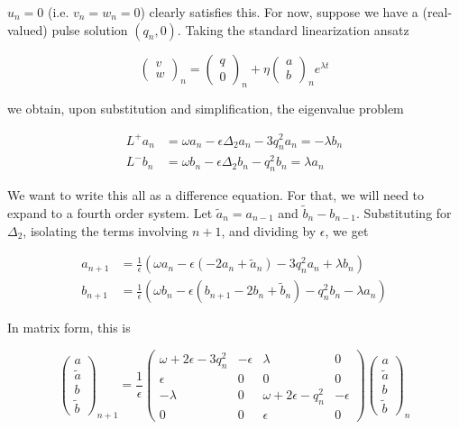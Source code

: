 \documentclass[12pt]{article}
\begin{document}
$u_n = 0$ (i.e. $v_n = w_n = 0$) clearly satisfies this. For now, suppose we have a (real-valued) pulse solution $(q_n, 0)$. Taking the standard linearization ansatz

\[
\begin{pmatrix}v \\ w\end{pmatrix}_n = 
\begin{pmatrix}q \\ 0\end{pmatrix}_n + 
\eta \begin{pmatrix}a \\ b\end{pmatrix}_n e^{\lambda t}
\]

we obtain, upon substitution and simplification, the eigenvalue problem

\begin{align*}
L^+ a_n &= \omega a_n - \epsilon \Delta_2 a_n - 3 q_n^2 a_n = -\lambda b_n \\
L^- b_n &= \omega b_n - \epsilon \Delta_2 b_n - q_n^2 b_n = \lambda a_n
\end{align*}

We want to write this all as a difference equation. For that, we will need to expand to a fourth order system. Let $\tilde{a}_n = a_{n-1}$ and $\tilde{b}_n - b_{n-1}$. Substituting for $\Delta_2$, isolating the terms involving $n+1$, and dividing by $\epsilon$, we get

\begin{align*}
a_{n+1} &= \frac{1}{\epsilon}( \omega a_n - \epsilon (- 2 a_n + \tilde{a}_n) - 3 q_n^2 a_n + \lambda b_n ) \\
b_{n+1} &= \frac{1}{\epsilon}( \omega b_n - \epsilon (b_{n+1} - 2 b_n + \tilde{b}_n) - q_n^2 b_n - \lambda a_n )
\end{align*}

In matrix form, this is

\[
\begin{pmatrix}
a \\ \tilde{a} \\ b \\ \tilde{b}
\end{pmatrix}_{n+1} =
\frac{1}{\epsilon}
\begin{pmatrix}
\omega + 2 \epsilon - 3 q_n^2 & -\epsilon & \lambda & 0 \\
\epsilon & 0 & 0 & 0 \\
-\lambda & 0 & \omega + 2 \epsilon - q_n^2 & -\epsilon \\
0 & 0 & \epsilon & 0
\end{pmatrix}
\begin{pmatrix}
a \\ \tilde{a} \\ b \\ \tilde{b}
\end{pmatrix}_{n}
\]
\end{document}

